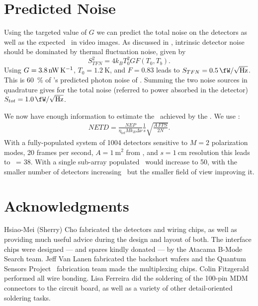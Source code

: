 \section{Predicted Noise} \label{sec:ch5-predicted-noise}

Using the targeted value of $G$ we can predict the total noise on the detectors as well as the expected \NETD\ in video images.
As discussed in , intrinsic detector noise should be dominated by thermal fluctuation noise, given by
\begin{equation}
  S^2_{TFN} = 4 k_B T_0^2 G F(T_0, T_b).
\end{equation}
Using $G = \SI{3.8}{\nW\per\K}$, $T_0 = \SI{1.2}{\K}$, and $F = 0.83$ leads to $S_{TFN} = \Pnoisef{0.5}$.
This is \SI{60}{\percent} of 's predicted photon noise of .
Summing the two noise sources in quadrature gives for the total noise (referred to power absorbed in the detector) $S_{tot} = \Pnoisef{1.0}$.

We now have enough information to estimate the \NETD\ achieved by the \Imager.
We use :
\begin{align}
  NETD = \frac{NEP}{\eta_{tot} M k_B \Delta \nu} \frac{1}{s} \sqrt{\frac{A\,FPS}{2 N}} .
\end{align}
With a fully-populated system of 1004 detectors sensitive to $M=2$ polarization modes, 20 frames per second, $A = \SI{1}{\m^2}$ from , and $ s = \SI{1}{\cm}$ resolution this leads to \NETD\ = \SI{38}{\mK}.
With a single sub-array populated \NETD\ would increase to \SI{50}{\mK}, with the smaller number of detectors increasing \NETD\ but the smaller field of view improving it. 

\section{Acknowledgments}

Hsiao-Mei (Sherry) Cho fabricated the detectors and wiring chips, as well as providing much useful advice during the design and layout of both.
The interface chips were designed --- and spares kindly donated --- by the Atacama B-Mode Search team.
Jeff Van Lanen fabricated the backshort wafers and the Quantum Sensors Project \SQUID\ fabrication team made the multiplexing chips.
Colin Fitzgerald performed all wire bonding.
Lisa Ferreira did the soldering of the 100-pin MDM connectors to the circuit board, as well as a variety of other detail-oriented soldering tasks.
